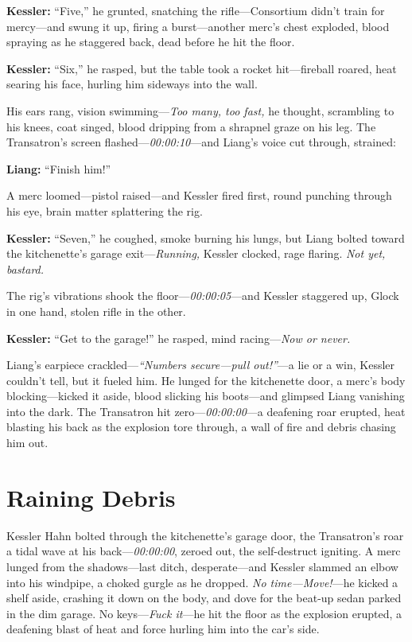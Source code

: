 \documentclass[12pt]{book}
\begin{document}
\vspace{0.5em}
\textbf{Kessler:} “Five,” he grunted, snatching the rifle—Consortium didn’t train for mercy—and swung it up, firing a burst—another merc’s chest exploded, blood spraying as he staggered back, dead before he hit the floor.

\vspace{0.5em}
\textbf{Kessler:} “Six,” he rasped, but the table took a rocket hit—fireball roared, heat searing his face, hurling him sideways into the wall.

His ears rang, vision swimming—\emph{Too many, too fast,} he thought, scrambling to his knees, coat singed, blood dripping from a shrapnel graze on his leg. The Transatron’s screen flashed—\emph{00:00:10}—and Liang’s voice cut through, strained: 

\vspace{0.5em}
\textbf{Liang:} “Finish him!”

A merc loomed—pistol raised—and Kessler fired first, round punching through his eye, brain matter splattering the rig. 

\vspace{0.5em}
\textbf{Kessler:} “Seven,” he coughed, smoke burning his lungs, but Liang bolted toward the kitchenette’s garage exit—\emph{Running,} Kessler clocked, rage flaring. \emph{Not yet, bastard.}

The rig’s vibrations shook the floor—\emph{00:00:05}—and Kessler staggered up, Glock in one hand, stolen rifle in the other. 

\vspace{0.5em}
\textbf{Kessler:} “Get to the garage!” he rasped, mind racing—\emph{Now or never.}

Liang’s earpiece crackled—\emph{“Numbers secure—pull out!”}—a lie or a win, Kessler couldn’t tell, but it fueled him. He lunged for the kitchenette door, a merc’s body blocking—kicked it aside, blood slicking his boots—and glimpsed Liang vanishing into the dark. The Transatron hit zero—\emph{00:00:00}—a deafening roar erupted, heat blasting his back as the explosion tore through, a wall of fire and debris chasing him out.

\vspace{1em}

\section{Raining Debris}

Kessler Hahn bolted through the kitchenette’s garage door, the Transatron’s roar a tidal wave at his back—\emph{00:00:00}, zeroed out, the self-destruct igniting. A merc lunged from the shadows—last ditch, desperate—and Kessler slammed an elbow into his windpipe, a choked gurgle as he dropped. \emph{No time—Move!}—he kicked a shelf aside, crashing it down on the body, and dove for the beat-up sedan parked in the dim garage. No keys—\emph{Fuck it}—he hit the floor as the explosion erupted, a deafening blast of heat and force hurling him into the car’s side.
\end{document}
